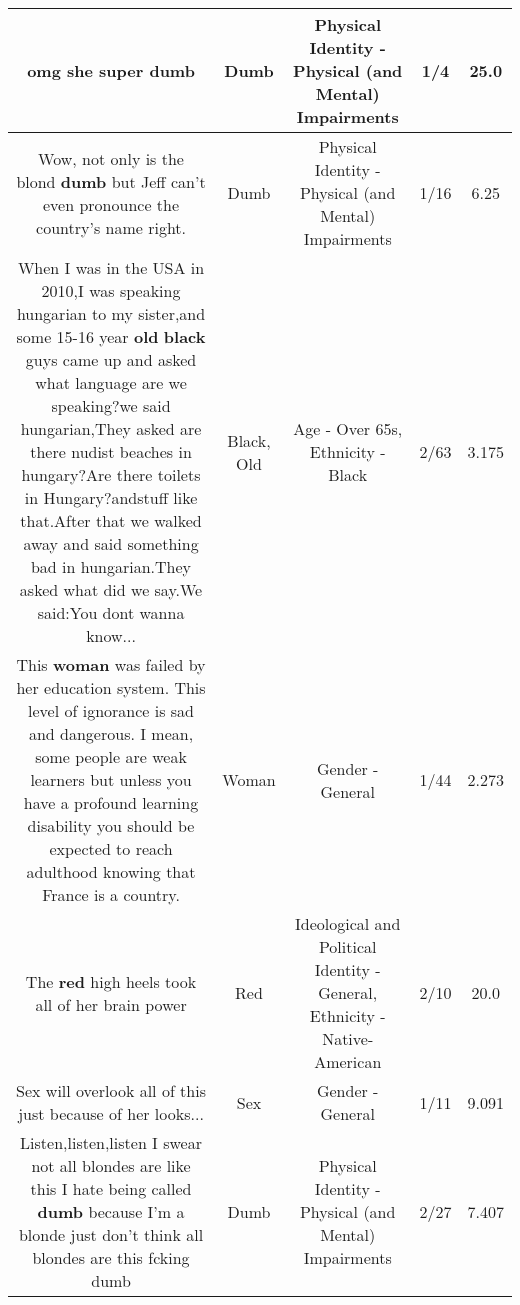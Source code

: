 \documentclass[11pt]{article}
\newlength\mylength
\begin{document}
\begin{center}
\begin{longtable}{|C{.65\mylength}|C{.30\mylength}|C{.12\mylength}|C{.12\mylength}|C{.12\mylength}|}
  \small omg she super dumb\normalsize   & Dumb & Physical Identity - Physical (and Mental) Impairments & 1/4 & 25.0 \\  \hline
  \small Wow, not only is the blond \textbf{dumb} but Jeff can't even pronounce the country's name right.\normalsize   & Dumb & Physical Identity - Physical (and Mental) Impairments & 1/16 & 6.25 \\  \hline
  \small When I was in the USA in 2010,I was speaking hungarian to my sister,and some 15-16 year \textbf{old} \textbf{black} guys came up and asked what language are we speaking?we said hungarian,They asked are there nudist beaches in hungary?Are there toilets in Hungary?andstuff like that.After that we walked away and said something bad in hungarian.They asked what did we say.We said:You dont wanna know...\normalsize   & Black, Old & Age - Over 65s, Ethnicity - Black & 2/63 & 3.175 \\  \hline
  \small This \textbf{woman} was failed by her education system. This level of ignorance is sad and dangerous. I mean,  some people are weak learners but unless you have a profound learning disability you should be expected to reach adulthood knowing that France is a country.\normalsize   & Woman & Gender - General & 1/44 & 2.273 \\  \hline
  \small The \textbf{r\textbf{ed}} high heels took all of her brain power\normalsize   & Red &  Ideological and Political Identity - General, Ethnicity - Native-American & 2/10 & 20.0 \\  \hline
  \small Sex will overlook all of this  just because of her looks...\normalsize   & Sex & Gender - General & 1/11 & 9.091 \\  \hline
  \small Listen,listen,listen I swear not all blondes are like this I hate being called \textbf{dumb} because I'm a blonde just don't think all blondes are this fcking dumb\normalsize   & Dumb & Physical Identity - Physical (and Mental) Impairments & 2/27 & 7.407 \\  \hline

\end{longtable}
\end{center}
\end{document}
